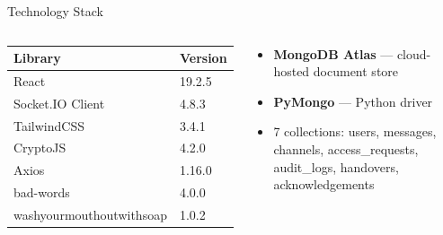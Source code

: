 \documentclass[aspectratio=169,12pt]{beamer}
\begin{document}
\begin{frame}{Technology Stack}
\begin{columns}[t]
\begin{tcolorbox}[colback=BPGreen!8,colframe=BPGreen,arc=6pt,
  title={\faCode\ \textbf{Frontend}},
  fonttitle=\bfseries\color{white},
  attach boxed title to top left={yshift=-2mm,xshift=4mm},
  boxed title style={colback=BPGreen}]
\small
\begin{tabular}{@{}p{}p{}@{}}
  \toprule
  \textbf{Library} & \textbf{Version} \\
  \midrule
  React                    & 19.2.5 \\
  Socket.IO Client         & 4.8.3  \\
  TailwindCSS              & 3.4.1  \\
  CryptoJS                 & 4.2.0  \\
  Axios                    & 1.16.0 \\
  bad-words                & 4.0.0  \\
  washyourmouthoutwithsoap & 1.0.2  \\
  \bottomrule
\end{tabular}
\end{tcolorbox}

\vspace{6pt}
\begin{tcolorbox}[colback=AccentGold!10,colframe=AccentGold,arc=6pt,
  title={\faDatabase\ \textbf{Database}},
  fonttitle=\bfseries\color{white},
  attach boxed title to top left={yshift=-2mm,xshift=4mm},
  boxed title style={colback=AccentGold!80!black}]
\small
\begin{itemize}\setlength\itemsep{3pt}
  \item \textbf{MongoDB Atlas} --- cloud-hosted document store
  \item \textbf{PyMongo} --- Python driver
  \item 7 collections: users, messages, channels, access\_requests, audit\_logs, handovers, acknowledgements
\end{itemize}
\end{tcolorbox}


\end{columns}
\end{frame}
\end{document}
